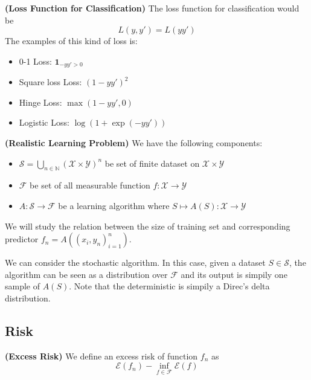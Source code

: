\begin{remark}{\textbf{(Loss Function for Classification)}}
    The loss function for classification would be 
    \begin{equation*}
        L(y,y') = L(yy')
    \end{equation*}
    The examples of this kind of loss is:
    \begin{itemize}
        \item 0-1 Loss: $\boldsymbol 1_{-yy'>0}$
        \item Square loss Loss: $(1-yy')^2$
        \item Hinge Loss: $\max(1-yy',0)$
        \item Logistic Loss: $\log(1+\exp(-yy'))$
    \end{itemize}
\end{remark}

\begin{definition}{\textbf{(Realistic Learning Problem)}}
    We have the following components:
    \begin{itemize}
        \item $\mathcal{S} = \bigcup_{n\in\mathbb{N}}(\mathcal{X}\times\mathcal{Y})^n$ be set of finite dataset on $\mathcal{X}\times\mathcal{Y}$
        \item $\mathcal{F}$ be set of all measurable function $f:\mathcal{X}\rightarrow\mathcal{Y}$
        \item $A:\mathcal{S}\rightarrow\mathcal{F}$ be a learning algorithm where $S \mapsto A(S) : \mathcal{X} \rightarrow \mathcal{Y}$
    \end{itemize}
    We will study the relation between the size of training set and corresponding predictor $f_n = A((x_i, y_n)^n_{i=1})$.
\end{definition}

\begin{remark}
    We can consider the stochastic algorithm. In this case, given a dataset $S\in\mathcal{S}$, the algorithm can be seen as a distribution over $\mathcal{F}$ and its output is simpily one sample of $A(S)$. Note that the deterministic is simpily a Direc's delta distribution.
\end{remark}

\subsection{Risk}

\begin{definition}{\textbf{(Excess Risk)}}
    We define an excess risk of function $f_n$ as 
    \begin{equation*}
        \mathcal{E}(f_n) - \inf_{f\in\mathcal{F}}\mathcal{E}(f)
    \end{equation*}
\end{definition}

